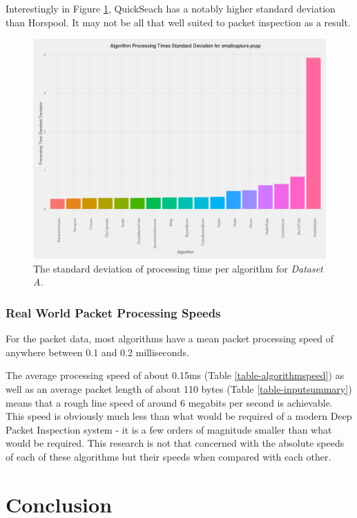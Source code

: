 \documentclass[9pt, technote]{IEEEtran}
\begin{document}
Interestingly in Figure \ref{figure-standarddeviation}, QuickSeach has a notably higher standard deviation than Horspool. It may not be all that well suited to packet inspection as a result.

\begin{figure}[hbt]
  \includegraphics[width=\columnwidth]{images/bar_graph_algorithm_standard_deviation_pcap}
  \caption{The standard deviation of processing time per algorithm for \textit{Dataset A}.}
  \label{figure-standarddeviation}
\end{figure}


\subsubsection{Real World Packet Processing Speeds}

For the packet data, most algorithms have a mean packet processing speed of anywhere between 0.1 and 0.2 milliseconds.

The average processing speed of about 0.15ms (Table \ref{table-algorithmspeed}) as well as an average packet length of about 110 bytes (Table \ref{table-inputsummary}) means that a rough line speed of around 6 megabits per second is achievable. This speed is obviously much less than what would be required of a modern Deep Packet Inspection system - it is a few orders of magnitude smaller than what would be required. This research is not that concerned with the absolute speeds of each of these algorithms but their speeds when compared with each other. 

\section{Conclusion}
\end{document}
